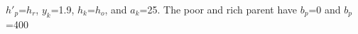 $h'_p$=$h_r$, $y_k$=1.9, $h_k$=$h_o$, and $a_k$=25. The poor and rich parent have $b_p$=0 and $b_p$=400